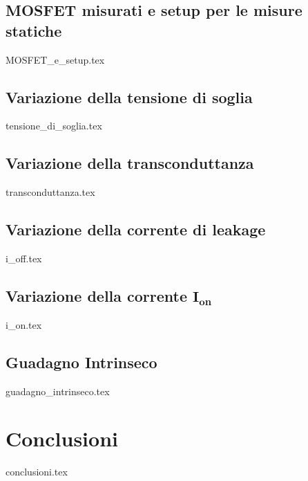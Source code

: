 \documentclass[
	a4paper,
	cleardoublepage=empty,
	headings=twolinechapter,
	numbers=autoenddot,
]{scrbook}
\begin{document}
\section{MOSFET misurati e setup per le misure statiche}
{MOSFET_e_setup.tex}

\section{Variazione della tensione di soglia}
\label{cap2:vth}
{tensione_di_soglia.tex}

\section{Variazione della transconduttanza}\label{sec:transconduttanza}
{transconduttanza.tex}

\section{Variazione della corrente di leakage}
{i_off.tex}

\section[Variazione della corrente $I_{on}$]{Variazione della corrente $\bm{I_{on}}$}
{i_on.tex}

\section{Guadagno Intrinseco}
{guadagno_intrinseco.tex}


\chapter*{Conclusioni}
{conclusioni.tex}

\backmatter




\end{document}
